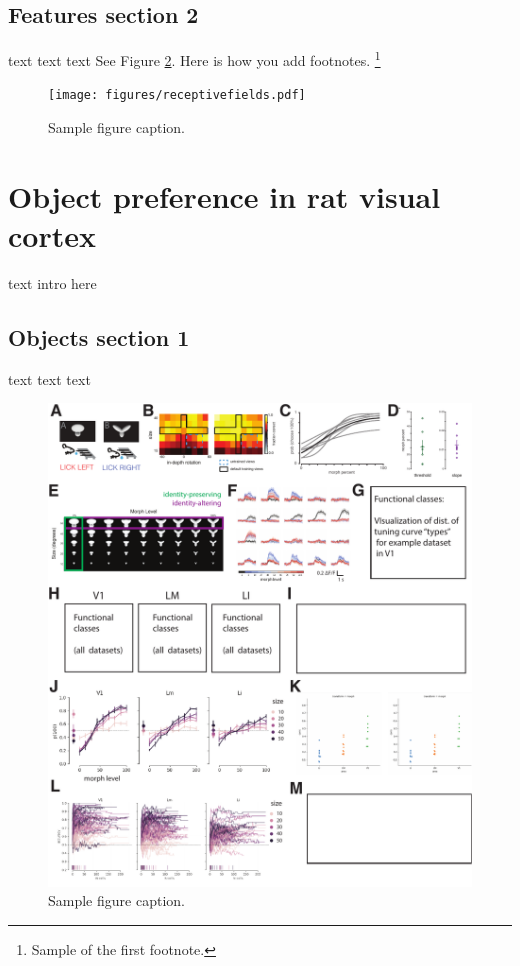 \documentclass{article}
\begin{document}
\subsection{Features section 2}
text text text
See Figure \ref{fig:fig1}. Here is how you add footnotes. \footnote{Sample of the first footnote.}

\begin{figure}[ht]
  \centering
  \texttt{[image: figures/receptivefields.pdf]}
  \caption{Sample figure caption.}
  \label{fig:fig1}
\end{figure}


\section{Object preference in rat visual cortex}
\label{sec:others}
text intro here

\subsection{Objects section 1}
text text text

\begin{figure}[ht]
  \centering
  \includegraphics{figures/objects.pdf}
  \caption{Sample figure caption.}
  \label{fig:fig1}
\end{figure}
\end{document}
